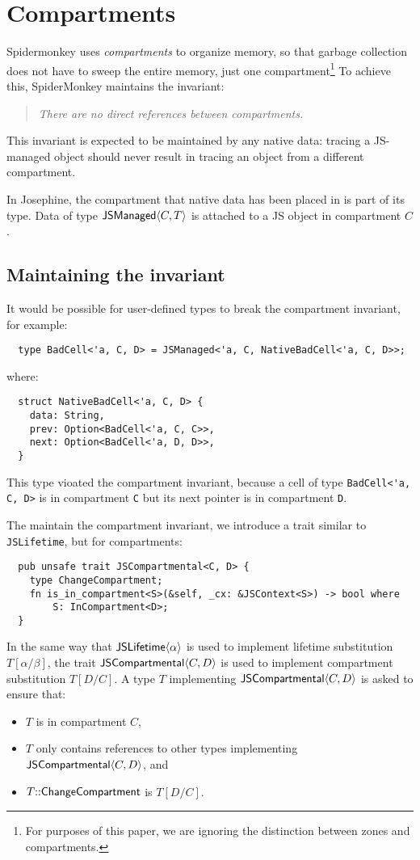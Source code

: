 \section{Compartments}

Spidermonkey uses \emph{compartments} to organize memory,
so that garbage collection does not have to sweep the
entire memory, just one compartment\footnote{%
  For purposes of this paper, we are ignoring the distinction between zones and
  compartments.
}
To achieve this, SpiderMonkey maintains the invariant:
\begin{quote}\em
  There are no direct references between compartments.
\end{quote}
This invariant is expected to be maintained by
any native data: tracing a JS-managed object
should never result in tracing an object from a different
compartment.

In Josephine, the compartment that
native data has been placed in is part of its
type. Data of type $\mathsf{JSManaged}\langle C,T\rangle$ is attached
to a JS object in compartment $C$.

\subsection{Maintaining the invariant}

It would be possible for user-defined types to break
the compartment invariant, for example:
\begin{verbatim}
  type BadCell<'a, C, D> = JSManaged<'a, C, NativeBadCell<'a, C, D>>;
\end{verbatim}
where:
\begin{verbatim}
  struct NativeBadCell<'a, C, D> {
    data: String,
    prev: Option<BadCell<'a, C, C>>,
    next: Option<BadCell<'a, D, D>>,
  }
\end{verbatim}
This type vioated the compartment invariant, because
a cell of type \verb|BadCell<'a, C, D>| is in compartment
\verb|C| but its next pointer is in compartment \verb|D|.

The maintain the compartment invariant, we introduce
a trait similar to \verb|JSLifetime|, but for compartments:
\begin{verbatim}
  pub unsafe trait JSCompartmental<C, D> {
    type ChangeCompartment;
    fn is_in_compartment<S>(&self, _cx: &JSContext<S>) -> bool where
        S: InCompartment<D>;
  }
\end{verbatim}
In the same way that $\mathsf{JSLifetime}\langle \alpha\rangle$ is used to implement
lifetime substitution $T[\alpha/\beta]$, the trait $\mathsf{JSCompartmental}\langle C,D\rangle$
is used to implement compartment substitution $T[D/C]$. A type $T$ implementing
$\mathsf{JSCompartmental}\langle C,D\rangle$ is asked to ensure that:
\begin{itemize}
\item $T$ is in compartment $C$,
\item $T$ only contains references to other types implementing $\mathsf{JSCompartmental}\langle C,D\rangle$, and
\item $T{::}\mathsf{ChangeCompartment}$ is $T[D/C]$.
\end{itemize}



